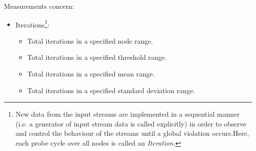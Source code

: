 \documentclass{article}
\begin{document}
			Measurements concern:
			\begin{itemize}
			\item Iterations\footnote{New data from the input streams are implemented in a sequential manner (i.e. a generator of input stream data is called explicitly) in order to observe and control the behaviour of the streams until a global violation occurs.Here, each probe cycle over all nodes is called an \emph{Iteration}.}:
			\begin{itemize}
				\item Total iterations in a specified node range.	
				\item Total iterations in a specified threshold range.
				\item Total iterations in a specified mean range.
				\item Total iterations in a specified standard deviation range.
			\end{itemize}
			

\end{itemize}
\end{document}
